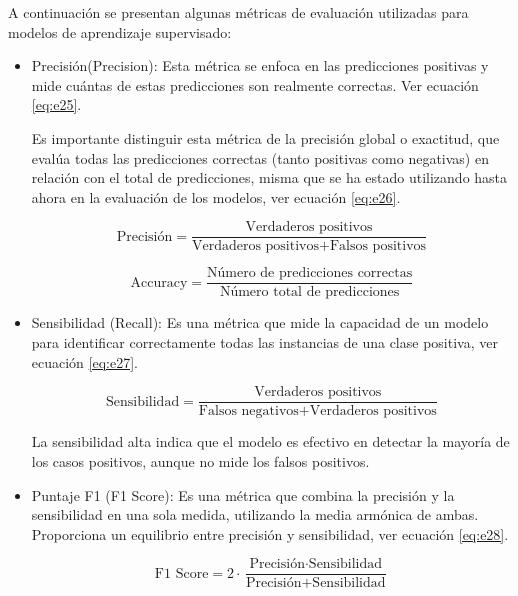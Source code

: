 A continuación se presentan algunas métricas de evaluación utilizadas para modelos de aprendizaje supervisado:

\begin{itemize}

\item Precisión(Precision): Esta métrica se enfoca en las predicciones positivas y mide cuántas de estas predicciones son realmente correctas. Ver ecuación \ref{eq:e25}.

Es importante distinguir esta métrica de la precisión global o exactitud, que evalúa todas las predicciones correctas (tanto positivas como negativas) en relación con el total de predicciones, misma que se ha estado utilizando hasta ahora en la evaluación de los modelos, ver ecuación \ref{eq:e26}.


\begin{equation} \label{eq:e25} 
	\text{Precisión} = \frac{\text{Verdaderos positivos}}{\text{Verdaderos positivos} + \text{Falsos positivos}}
\end{equation}

\begin{equation} \label{eq:e26} 
	\text{Accuracy} = \frac{\text{Número de predicciones correctas}}{\text{Número total de predicciones} }
\end{equation}

\item Sensibilidad (Recall): Es una métrica que mide la capacidad de un modelo para identificar correctamente todas las instancias de una clase positiva, ver ecuación \ref{eq:e27}.

\begin{equation} \label{eq:e27} 
	\text{Sensibilidad} = \frac{\text{Verdaderos positivos}}{\text{Falsos negativos} + \text{Verdaderos positivos} }
\end{equation}

La sensibilidad alta indica que el modelo es efectivo en detectar la mayoría de los casos positivos, aunque no mide los falsos positivos.

\item Puntaje F1 (F1 Score): Es una métrica que combina la precisión y la sensibilidad en una sola medida, utilizando la media armónica de ambas. Proporciona un equilibrio entre precisión y sensibilidad, ver ecuación \ref{eq:e28}.

\begin{equation} \label{eq:e28}
	\text{F1 Score} = 2 \cdot \frac{\text{Precisión}\cdot\text{Sensibilidad}}{\text{Precisión} + \text{Sensibilidad} }
\end{equation}


\end{itemize}
